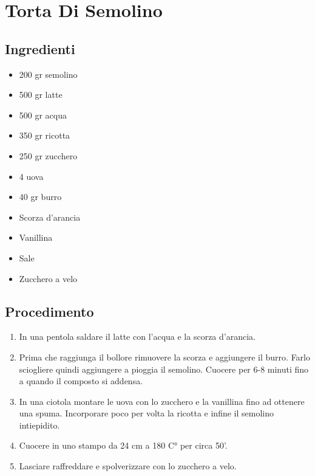 \section{Torta Di Semolino}
\subsection{Ingredienti}
\begin{itemize}
\item 200 gr semolino  
\item 500 gr latte  
\item 500 gr acqua  
\item 350 gr ricotta  
\item 250 gr zucchero  
\item 4 uova  
\item 40 gr burro  
\item Scorza d'arancia  
\item Vanillina  
\item Sale  
\item Zucchero a velo
\end{itemize}
\subsection{Procedimento}
\begin{enumerate}
\item  In una pentola saldare il latte con l'acqua e la scorza d'arancia.  
\item  Prima che raggiunga il bollore rimuovere la scorza e aggiungere il burro. Farlo sciogliere quindi aggiungere a pioggia il semolino. Cuocere per 6-8 minuti fino a quando il composto si addensa.  
\item  In una ciotola montare le uova con lo zucchero e la vanillina fino ad ottenere una spuma. Incorporare poco per volta la ricotta e infine il semolino intiepidito.  
\item  Cuocere in uno stampo da 24 cm a 180 C° per circa 50'.  
\item  Lasciare raffreddare e spolverizzare con lo zucchero a velo.
\end{enumerate}
